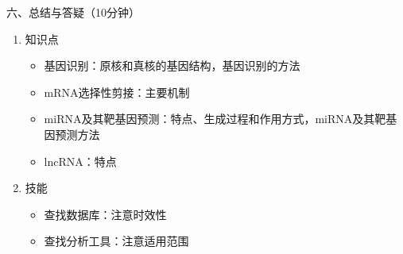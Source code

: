 \documentclass{TIJMUjiaoanLL}
\begin{document}
\noindent
六、总结与答疑（10分钟）
\begin{enumerate}
  \item 知识点
    \begin{itemize}
      \item 基因识别：原核和真核的基因结构，基因识别的方法
      \item mRNA选择性剪接：主要机制
      \item miRNA及其靶基因预测：特点、生成过程和作用方式，miRNA及其靶基因预测方法
      \item lncRNA：特点
    \end{itemize}
  \item 技能
    \begin{itemize}
      \item 查找数据库：注意时效性
      \item 查找分析工具：注意适用范围
    \end{itemize}
\end{enumerate}


\otherTail
\end{document}
